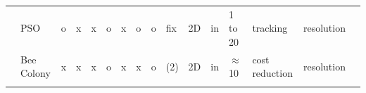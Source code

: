 \begin{landscape}
\begin{table}[]
\begin{tabular}{@{}  l|p{1.6cm} p{1.7cm} l  l p{0.659cm} p{0.612cm}p{.659cm} p{1.11cm} p{1.5cm} p{1.57cm}p{0.9cm}p{1.6cm}p{1.3cm}p{1.2cm} p{1.2cm}@{}}
\multicolumn{1}{l|}{\cellcolor[HTML]{FFFFFF}\cite{8*zhou2011}}   & PSO                                                                                                            & o                                                                     & x                                              & x                                              & o                                              & x                                                & o                                                 & o                                                 & fix                                                       & 2D                                                                                                              & in                                                           & 1 to 20                                                                                                   & tracking                                                                                                                    & resolution                    &                                  \\
\rowcolor[HTML]{EFEFEF} 
\multicolumn{1}{l|}{\cellcolor[HTML]{EFEFEF}\cite{82*chrysostomou2012}}  & Bee \newline Colony                                                                                                     & x                                                                     & x                                              & x                                              & o                                              & x                                                & x                                                 & o                                                 & (2)                                                  & 2D                                                                                                              & in                                                           & $\approx$ 10                                                                                              & cost reduction                                                                                                              & resolution                    &                                  \\
\rowcolor[HTML]{FFFFFF} 

\end{tabular}
\end{table}
\end{landscape}
